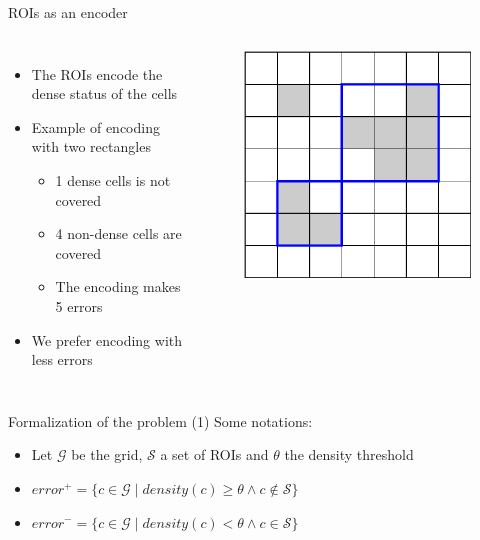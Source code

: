 \documentclass[10pt]{beamer}
\begin{document}
\begin{frame}{ROIs as an encoder}

\begin{columns}[T, onlytextwidth]
    \begin{itemize}
        \item The ROIs encode the dense status of the cells
        \item Example of encoding with two rectangles
        \begin{itemize}
            \item 1 dense cells is not covered
            \item 4 non-dense cells are covered
            \item The encoding makes 5 errors
        \end{itemize}
        \item We prefer encoding with less errors
    \end{itemize}
    
    \begin{figure}
        \centering
        \includegraphics[scale=0.5]{figures/running-example/ILP/running-ex-ilp1.pdf}
    \end{figure}
\end{columns}

\end{frame}

\begin{frame}{Formalization of the problem (1)}
Some notations:
    \begin{itemize}
        \item Let $\mathcal{G}$ be the grid, $\mathcal{S}$ a set of ROIs and $\theta$ the density threshold
        \item $error^+ = \{c \in \mathcal{G} \mid density(c) \geq \theta \land c \notin \mathcal{S}\}$
        \item $error^- = \{c \in \mathcal{G} \mid density(c) < \theta \land c \in \mathcal{S} \}$
    \end{itemize}
\end{frame}
\end{document}

